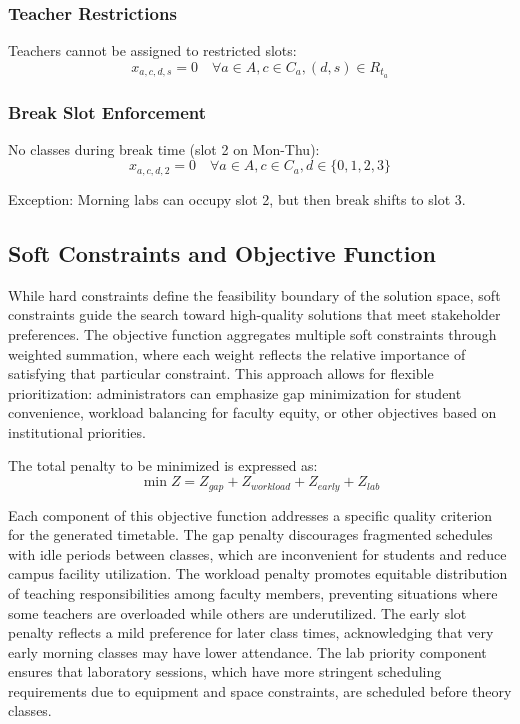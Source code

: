 \documentclass[12pt,a4paper]{article}
\begin{document}
\subsubsection{Teacher Restrictions}
Teachers cannot be assigned to restricted slots:
\begin{equation}
x_{a,c,d,s} = 0 \quad \forall a \in A, c \in C_a, (d,s) \in R_{t_a}
\end{equation}

\subsubsection{Break Slot Enforcement}
No classes during break time (slot 2 on Mon-Thu):
\begin{equation}
x_{a,c,d,2} = 0 \quad \forall a \in A, c \in C_a, d \in \{0,1,2,3\}
\end{equation}

Exception: Morning labs can occupy slot 2, but then break shifts to slot 3.


\subsection{Soft Constraints and Objective Function}

While hard constraints define the feasibility boundary of the solution space, soft constraints guide the search toward high-quality solutions that meet stakeholder preferences. The objective function aggregates multiple soft constraints through weighted summation, where each weight reflects the relative importance of satisfying that particular constraint. This approach allows for flexible prioritization: administrators can emphasize gap minimization for student convenience, workload balancing for faculty equity, or other objectives based on institutional priorities.

The total penalty to be minimized is expressed as:
\begin{equation}
\min Z = Z_{gap} + Z_{workload} + Z_{early} + Z_{lab}
\end{equation}

Each component of this objective function addresses a specific quality criterion for the generated timetable. The gap penalty discourages fragmented schedules with idle periods between classes, which are inconvenient for students and reduce campus facility utilization. The workload penalty promotes equitable distribution of teaching responsibilities among faculty members, preventing situations where some teachers are overloaded while others are underutilized. The early slot penalty reflects a mild preference for later class times, acknowledging that very early morning classes may have lower attendance. The lab priority component ensures that laboratory sessions, which have more stringent scheduling requirements due to equipment and space constraints, are scheduled before theory classes.
\end{document}
